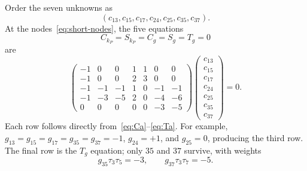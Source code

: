 \documentclass[11pt]{article}
\theoremstyle{definition}
\begin{document}
Order the seven unknowns as
\[
(c_{13},c_{15},c_{17},c_{24},c_{25},c_{35},c_{37}).
\]
At the nodes~\eqref{eq:short-nodes}, the five equations
\[
C_{k_P}=S_{k_P}=C_g=S_g=T_g=0
\]
are
\begin{equation}
\begin{pmatrix}
-1&0&0&1&1&0&0\\
-1&0&0&2&3&0&0\\
-1&-1&-1&1&0&-1&-1\\
-1&-3&-5&2&0&-4&-6\\
0&0&0&0&0&-3&-5
\end{pmatrix}
\begin{pmatrix}
c_{13}\\c_{15}\\c_{17}\\c_{24}\\c_{25}\\c_{35}\\c_{37}
\end{pmatrix}
=0.
\label{eq:five-seven}
\end{equation}
Each row follows directly from~\eqref{eq:Ca}--\eqref{eq:Ta}.  For example, $g_{13}=g_{15}=g_{17}=g_{35}=g_{37}=-1$, $g_{24}=+1$, and $g_{25}=0$, producing the third row.  The final row is the $T_g$ equation; only $35$ and $37$ survive, with weights
\[
g_{35}\tau_3\tau_5=-3,
\qquad
g_{37}\tau_3\tau_7=-5.
\]
\end{document}
